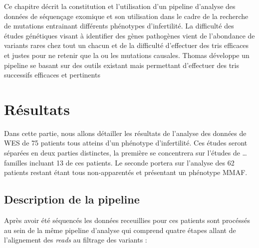 \documentclass[12pt,twoside]{reedthesis}
\theoremstyle{definition}
\theoremstyle{definition}
\theoremstyle{remark}
\begin{document}
  Ce chapitre décrit la constitution et l'utilisation d'un pipeline
  d'analyse des données de séquençage exomique et son utilisation dans le
  cadre de la recherche de mutations entrainant différents phénotypes
  d'infertilité. La difficulté des études génétiques visant à identifier
  des gènes pathogènes vient de l'abondance de variants rares chez tout un
  chacun et de la difficulté d'effectuer des tris efficaces et justes pour
  ne retenir que la ou les mutations causales. Thomas développe un
  pipeline se basant sur des outils existant mais permettant d'effectuer
  des tris successifs efficaces et pertinents
  
  \newpage
  
  \section{Résultats}\label{resultats}
  
  Dans cette partie, nous allons détailler les résultats de l'analyse des
  données de WES de 75 patients tous atteins d'un phénotype d'infertilité.
  Ces études seront séparées en deux parties distinctes, la première se
  concentrera sur l'études de \ldots{} familles incluant 13 de ces
  patients. Le seconde portera sur l'analyse des 62 patients restant étant
  tous non-apparentés et présentant un phénotype MMAF.
  
  \subsection{Description de la
  pipeline}\label{description-de-la-pipeline}
  
  Après avoir été séquencés les données receuillies pour ces patients sont
  procéssés au sein de la même pipeline d'analyse qui comprend quatre
  étapes allant de l'alignement des \emph{reads} au filtrage des variants
  :
  
\end{document}
